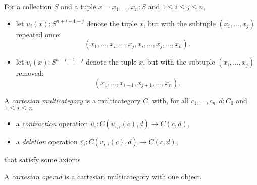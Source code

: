For a collection $ S $ and a tuple $ x = x_1, \dots, x_n: S $ and $ 1 \leq i \leq j \leq n $,
\begin{itemize}
  \item let $ u_i(x): S^{n+i+1-j} $ denote the tuple $ x $, but with the subtuple $ (x_i, \dots, x_j) $ repeated once:
    \[ (x_1, \dots, x_i, \dots, x_j, x_i, \dots, x_j, \dots, x_n). \]
  \item let $ v_i(x): S^{n-i-1+j} $ denote the tuple $ x $, but with the subtuple $ (x_i, \dots, x_j) $ removed:
    \[ (x_1, \dots, x_{i-1}, x_{j+1}, \dots, x_n). \]
\end{itemize}

\begin{definition}
  A \textit{cartesian multicategory} is a multicategory $ C $, with, for all $ c_1, \dots, c_n, d: C_0 $ and $ 1 \leq i \leq n $
  \begin{itemize}
    \item a \textit{contraction} operation $ \overline{u_i}: C(u_{i, i}(c), d) \to C(c, d) $,
    \item a \textit{deletion} operation $ \overline {v_i}: C(v_{i, i}(c), d) \to C(c, d) $,
  \end{itemize}
  that satisfy some axioms \TODO
\end{definition}

\begin{definition}
  A \textit{cartesian operad} is a cartesian multicategory with one object.
\end{definition}


